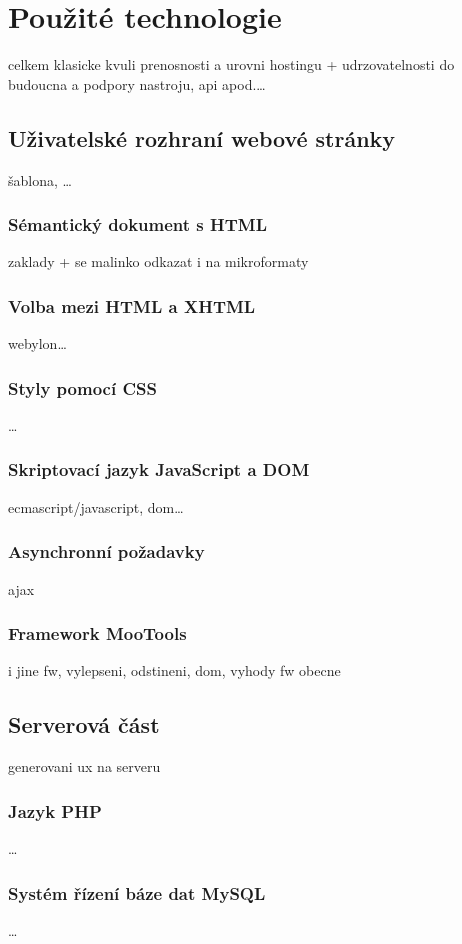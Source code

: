 \chapter{Použité technologie}
celkem klasicke kvuli prenosnosti a urovni hostingu +
udrzovatelnosti do budoucna a podpory nastroju, api apod.\ldots

\section{Uživatelské rozhraní webové stránky}
šablona, \ldots
\subsection{Sémantický dokument s HTML}
zaklady + se malinko odkazat i na mikroformaty

\subsection{Volba mezi HTML a XHTML}
webylon\ldots

\subsection{Styly pomocí CSS}
\ldots

\subsection{Skriptovací jazyk JavaScript a DOM}\label{javaScript}
ecmascript/javascript, dom\ldots

\subsection{Asynchronní požadavky}\label{ajax}
ajax

\subsection{Framework MooTools}
i jine fw, vylepseni, odstineni, dom, vyhody fw obecne

\section{Serverová část}
generovani ux na serveru
\subsection{Jazyk PHP}
\ldots
\subsection{Systém řízení báze dat MySQL}
\ldots
